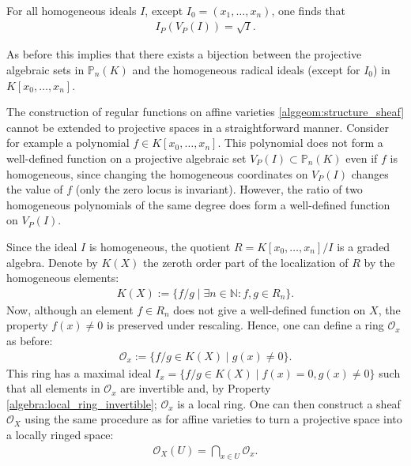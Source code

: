     \begin{theorem}
        For all homogeneous ideals $I$, except $I_0=(x_1,\ldots,x_n)$, one finds that
        \begin{gather}
            I_P(V_P(I)) = \sqrt{I}.
        \end{gather}
    \end{theorem}
    \begin{result}
        As before this implies that there exists a bijection between the projective algebraic sets in $\mathbb{P}_n(K)$ and the homogeneous radical ideals (except for $I_0$) in $K[x_0,\ldots,x_n]$.
    \end{result}


    The construction of regular functions on affine varieties \ref{alggeom:structure_sheaf} cannot be extended to projective spaces in a straightforward manner. Consider for example a polynomial $f\in K[x_0,\ldots,x_n]$. This polynomial does not form a well-defined function on a projective algebraic set $V_P(I)\subset\mathbb{P}_n(K)$ even if $f$ is homogeneous, since changing the homogeneous coordinates on $V_P(I)$ changes the value of $f$ (only the zero locus is invariant). However, the ratio of two homogeneous polynomials of the same degree does form a well-defined function on $V_P(I)$.

    Since the ideal $I$ is homogeneous, the quotient $R=K[x_0,\ldots,x_n]/I$ is a graded algebra. Denote by $K(X)$ the zeroth order part of the localization of $R$ by the homogeneous elements:
    \begin{gather}
        K(X) := \{f/g\mid\exists n\in\mathbb{N}:f,g\in R_n\}.
    \end{gather}
    Now, although an element $f\in R_n$ does not give a well-defined function on $X$, the property $f(x)\neq0$ is preserved under rescaling. Hence, one can define a ring $\mathcal{O}_x$ as before:
    \begin{gather}
        \mathcal{O}_x := \{f/g\in K(X)\mid g(x)\neq 0\}.
    \end{gather}
    This ring has a maximal ideal $I_x = \{f/g\in K(X)\mid f(x)=0,g(x)\neq 0\}$ such that all elements in $\mathcal{O}_x$ are invertible and, by Property \ref{algebra:local_ring_invertible}; $\mathcal{O}_x$ is a local ring. One can then construct a sheaf $\mathcal{O}_X$ using the same procedure as for affine varieties to turn a projective space into a locally ringed space:
    \begin{gather}
        \mathcal{O}_X(U) = \bigcap_{x\in U}\mathcal{O}_x.
    \end{gather}

